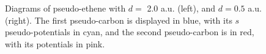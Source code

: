 \documentclass[12pt]{article}
\begin{document}
\begin{figure}
\begin{center}
%
\end{center}
\vspace{0.25in}
\hspace*{3in}

\caption{Diagrams of pseudo-ethene with \(d =\) 2.0 a.u. (left), and \(d = 0.5\) a.u. (right). The first pseudo-carbon is displayed in blue, with its \(s\) pseudo-potentials in cyan, and the second pseudo-carbon is in red, with its potentials in pink.}
\label{fig:long_r_ethene}
\end{figure}
\end{document}
